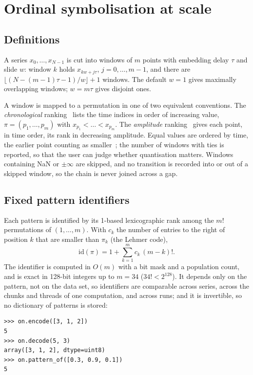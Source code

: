 \documentclass[aip,cha,reprint,amsmath,amssymb]{revtex4-2}
\begin{document}
\section{Ordinal symbolisation at scale}

\subsection{Definitions}

A series $x_0, \dots, x_{N-1}$ is cut into windows of $m$ points with embedding delay
$\tau$ and slide $w$: window $k$ holds $x_{kw + j\tau}$, $j = 0, \dots, m-1$, and there
are $\lfloor (N - (m-1)\tau - 1)/w \rfloor + 1$ windows. The default $w = 1$ gives
maximally overlapping windows; $w = m\tau$ gives disjoint ones.

A window is mapped to a permutation in one of two equivalent conventions. The
\emph{chronological} ranking~\cite{bandt2002} lists the time indices in order of
increasing value, $\pi = (p_1, \dots, p_m)$ with $x_{p_1} < \dots < x_{p_m}$. The
\emph{amplitude} ranking~\cite{small2013} gives each point, in time order, its rank in
decreasing amplitude. Equal values are ordered by time, the earlier point counting as
smaller~\cite{bandt2002}; the number of windows with ties is reported, so that the user
can judge whether quantisation matters. Windows containing NaN or $\pm\infty$ are
skipped, and no transition is recorded into or out of a skipped window, so the chain is
never joined across a gap.

\subsection{Fixed pattern identifiers}

Each pattern is identified by its 1-based lexicographic rank among the $m!$
permutations of $(1, \dots, m)$. With $c_k$ the number of entries to the right of
position $k$ that are smaller than $\pi_k$ (the Lehmer code),
\begin{equation}
\mathrm{id}(\pi) = 1 + \sum_{k=1}^{m} c_k\,(m-k)! .
\end{equation}
The identifier is computed in $O(m)$ with a bit mask and a population count, and is
exact in 128-bit integers up to $m = 34$ ($34! < 2^{128}$). It depends only on the
pattern, not on the data set, so identifiers are comparable across series, across the
chunks and threads of one computation, and across runs; and it is invertible, so no
dictionary of patterns is stored:
\begin{verbatim}
>>> on.encode([3, 1, 2])
5
>>> on.decode(5, 3)
array([3, 1, 2], dtype=uint8)
>>> on.pattern_of([0.3, 0.9, 0.1])
5
\end{verbatim}
\end{document}
